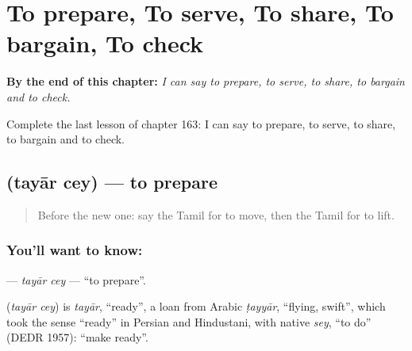 
\chapter{To prepare, To serve, To share, To bargain, To check}
\label{ch:ta-to-prepare-to-serve-to-share-to-bargain-to-check}

\begin{chapteropening}
\textbf{By the end of this chapter:} \emph{I can say to prepare, to serve, to share, to bargain and to check.}

Complete the last lesson of chapter 163: I can say to prepare, to serve, to share, to bargain and to check.
\end{chapteropening}

\section[\texorpdfstring{\ta{தயார்} \ta{செய்} (tayār cey)}{தயார் செய் (tayār cey)}]{  (tayār cey) — to prepare}

\label{lesson:TA-C163-tayar-cey}



\begin{quote}
Before the new one: say the Tamil for to move, then the Tamil for to lift.
\end{quote}

\subsection*{You'll want to know:  }
\textbf{ } — \emph{tayār cey} — \textquotedblleft{}to prepare\textquotedblright{}.

\begin{cousinweb}
\textbf{ } (\emph{tayār cey}) is \emph{tayār}, \textquotedblleft{}ready\textquotedblright{}, a loan from Arabic \emph{ṭayyār}, \textquotedblleft{}flying, swift\textquotedblright{}, which took the sense \textquotedblleft{}ready\textquotedblright{} in Persian and Hindustani, with native \emph{sey}, \textquotedblleft{}to do\textquotedblright{} (DEDR 1957): \textquotedblleft{}make ready\textquotedblright{}.
\end{cousinweb}

